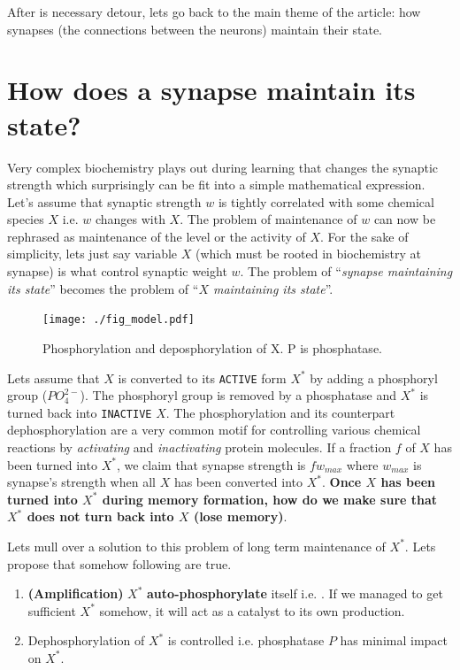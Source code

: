 \documentclass[]{resonance}
\begin{document}
{After is necessary detour, lets go back to the main theme of the article:
how synapses (the connections between the neurons) maintain their state.

\section{How does a synapse maintain its state?}

Very complex biochemistry plays out during learning that changes the synaptic
strength which surprisingly can be fit into a simple mathematical expression.
Let's assume that synaptic strength $w$ is tightly correlated with some chemical
species $X$ i.e. $w$ changes with $X$. The problem of maintenance of $w$ can now
be rephrased as maintenance of the level or the activity of $X$. For the sake of
simplicity, lets just say variable $X$ (which must be rooted in biochemistry at
synapse) is what control synaptic weight $w$. The problem of ``\emph{synapse
maintaining its state}'' becomes the problem of ``\emph{$X$ maintaining its
state}''.

\begin{figure}[!b]
    \caption{Phosphorylation and deposphorylation of X. P is phosphatase.}\label{fig:model}
    \texttt{[image: ./fig\_model.pdf]}
\end{figure}

Lets assume that $X$ is converted to its \texttt{ACTIVE} form $X^*$  by adding a
phosphoryl group ($PO_4^{2-}$). The phosphoryl group is removed by a phosphatase
and $X^*$ is turned back into \texttt{INACTIVE} $X$. The phosphorylation and its
counterpart dephosphorylation are a very common motif for controlling various
chemical reactions by \textit{activating} and \textit{inactivating} protein
molecules. If a fraction $f$ of $X$ has been turned into $X^*$, we claim that
synapse strength is $fw_{max}$ where $w_{max}$ is synapse's  strength when all
$X$ has been converted into $X^*$. \textbf{Once $X$ has been turned into $X^*$
during memory formation, how do we make sure that $X^*$ does not turn back
into $X$ (lose memory)}.

Lets mull over a solution to this problem of long term maintenance of $X^*$.
Lets propose that somehow following are true.  

\begin{enumerate}
    \item \textbf{(Amplification)} $X^*$ \textbf{auto-phosphorylate} itself i.e. . If we managed to get sufficient $X^*$ somehow, it
        will act as a catalyst to its own production. 
    \item Dephosphorylation of $X^*$ is controlled i.e. 
        phosphatase $P$ has minimal impact on $X^*$.
\end{enumerate} 

}
\end{document}
